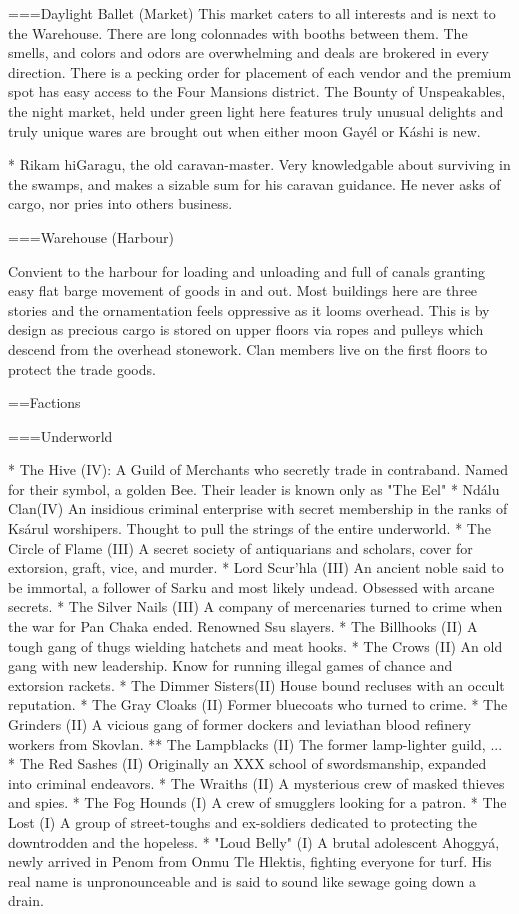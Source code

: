 ===Daylight Ballet (Market)
This market caters to all interests and is next to the Warehouse. There are long colonnades with booths  between them. The smells, and colors and odors are overwhelming and deals are brokered in every direction. There is a pecking order for placement of each vendor and the premium spot has easy access to the Four Mansions district. The Bounty of Unspeakables, the night market, held under green light here features truly unusual delights and truly unique wares are brought out when either moon Gayél or Káshi is new.

* Rikam hiGaragu, the old caravan-master. Very knowledgable about surviving in the swamps, and makes a sizable sum for his caravan guidance. He never asks of cargo, nor pries into others business.


===Warehouse (Harbour)

Convient to the harbour for loading and unloading and full of canals granting easy flat barge movement of goods in and out. Most buildings here are three stories and the ornamentation feels oppressive as it looms overhead. This is by design as precious cargo is stored on upper floors via ropes and pulleys which descend from the overhead stonework. Clan members live on the first floors to protect the trade goods.

==Factions

===Underworld

* The Hive (IV): A Guild of Merchants who secretly trade in contraband. Named for their symbol, a golden Bee. Their leader is known only as "The Eel"
* Ndálu Clan(IV) An insidious criminal enterprise with secret membership in the ranks of Ksárul worshipers. Thought to pull the strings of the entire underworld. 
* The Circle of Flame (III) A secret society of antiquarians and scholars, cover for extorsion, graft, vice, and murder.
* Lord Scur'hla (III) An ancient noble said to be immortal, a follower of Sarku and most likely undead. Obsessed with arcane secrets.
* The Silver Nails (III) A company of mercenaries turned to crime when the war for Pan Chaka ended. Renowned Ssu slayers. 
* The Billhooks (II) A tough gang of thugs wielding hatchets and meat hooks.
* The Crows (II) An old gang with new leadership. Know for running illegal games of chance and extorsion rackets. 
* The Dimmer Sisters(II) House bound recluses with an occult reputation.
* The Gray Cloaks (II) Former bluecoats who turned to crime.
* The Grinders (II) A vicious gang of former dockers and leviathan blood refinery workers from Skovlan.
** The Lampblacks (II) The former lamp-lighter guild, ...
* The Red Sashes (II) Originally an XXX school of swordsmanship, expanded into criminal endeavors.
* The Wraiths (II) A mysterious crew of masked thieves and spies.
* The Fog Hounds (I) A crew of smugglers looking for a patron.
* The Lost (I) A group of street-toughs and ex-soldiers dedicated to protecting the downtrodden and the hopeless.
* "Loud Belly" (I) A brutal adolescent Ahoggyá, newly arrived in Penom from Onmu Tle Hlektis, fighting everyone for turf. His real name is unpronounceable and is said to sound like sewage going down a drain.

